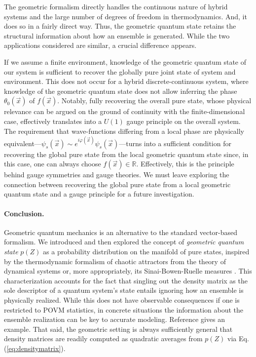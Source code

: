\documentclass[draft,nofootinbib,pre,twocolumn,showpacs,showkeys,preprintnumbers,floatfix]{revtex4-1}
\newcommand{\1}{\mathbbm{1}}
\begin{document}
The geometric formalism directly handles the continuous nature of hybrid
systems and the large number of degrees of freedom in thermodynamics. And, it
does so in a fairly direct way. Thus, the geometric quantum state retains the 
structural information about how an ensemble is generated. While the 
two applications considered are similar, a crucial difference appears.

If we assume a finite environment, knowledge of the geometric quantum state of
our system is sufficient to recover the globally pure joint state of system and
environment. This does not occur for a hybrid discrete-continuous system, where
knowledge of the geometric quantum state does not allow inferring the phase
$\theta_0(\vec{x})$ of $f(\vec{x})$. Notably, fully recovering the overall pure
state, whose physical relevance can be argued on the ground of continuity with
the finite-dimensional case, effectively translates into a $U(1)$ gauge
principle on the overall system. The requirement that wave-functions differing 
from a local phase are physically equivalent---$\psi_s(\vec{x}) \sim
e^{i\varphi(\vec{x})}\psi_s(\vec{x})$---turns into a sufficient condition for
recovering the global pure state from the local geometric quantum state since, 
in this case, one can always choose $f(\vec{x}) \in \mathbb{R}$. Effectively, this is
the principle behind gauge symmetries and gauge theories. We must leave
exploring the connection between recovering the global pure state from a local
geometric quantum state and a gauge principle for a future investigation.

\paragraph*{Conclusion.}
Geometric quantum mechanics is an alternative to the standard vector-based
formalism. We introduced and then explored the concept of \emph{geometric
quantum state} $p(Z)$ as a probability distribution on the manifold of pure
states, inspired by the thermodynamic formalism of chaotic attractors from the
theory of dynamical systems or, more appropriately, its Sinai-Bowen-Ruelle
measures \cite{Eckmann1985}. This characterization accounts for the fact 
that singling out the density matrix as the sole descriptor of a quantum 
system's state entails ignoring how an ensemble is physically realized.
While this does not have observable consequences if one is restricted to POVM
statistics, in concrete situations the information about the ensemble
realization can be key to accurate modeling. Reference \cite{Anza20c} gives an
example. That said, the geometric setting is always sufficiently general
that density matrices are readily computed as quadratic averages from $p(Z)$
via Eq. (\ref{eq:densitymatrix}).
\end{document}
